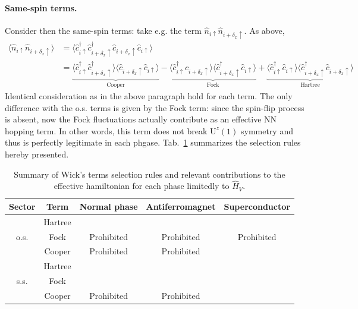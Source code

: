 \paragraph{Same-spin terms.} Consider then the same-spin terms: take e.g. the term $\hat n_{i\uparrow} \hat n_{i + \delta_x \uparrow}$. As above,
\[
\begin{aligned}
	\langle 
	\hat n_{i\uparrow} \hat n_{i + \delta_x \uparrow}
	\rangle &= \langle 
	\hat c_{i\uparrow}^\dagger \hat c_{i + \delta_x \uparrow}^\dagger \hat c_{i + \delta_x \uparrow} \hat c_{i\uparrow} 
	\rangle \\
	&= 
	\underbrace{
		\langle 
		\hat c_{i\uparrow}^\dagger \hat c_{i + \delta_x \uparrow}^\dagger
		\rangle \langle	
		\hat c_{i + \delta_x \uparrow} \hat c_{i\uparrow} 
		\rangle 
	}_{\text{Cooper}}
	- 
	\underbrace{
		\langle 
		\hat c_{i\uparrow}^\dagger \hat c_{i + \delta_x \uparrow}
		\rangle \langle	
		\hat c_{i + \delta_x \uparrow}^\dagger \hat c_{i\uparrow} 
		\rangle 
	}_{\text{Fock}}
	+ 
	\underbrace{
		\langle 
		\hat c_{i\uparrow}^\dagger \hat c_{i\uparrow}
		\rangle \langle	
		\hat c_{i + \delta_x \uparrow}^\dagger \hat c_{i + \delta_x \uparrow} 
		\rangle
	}_{\text{Hartree}}
\end{aligned}
\]
Identical consideration as in the above paragraph hold for each term. The only difference with the o.s. terms is given by the Fock term: since the spin-flip process is absent, now the Fock fluctuations actually contribute as an effective NN hopping term. In other words, this term does not break $\mathrm{U}^z(1)$ symmetry and thus is perfectly legitimate in each phgase. Tab.~\ref{tab:V-wick-terms-phases} summarizes the selection rules hereby presented.

\begin{table}
	\centering
	\begin{tabular}{c c c c c}
		\textbf{Sector}& \textbf{Term} & \textbf{Normal phase} & \textbf{Antiferromagnet} & \textbf{Superconductor} \\
		\midrule
		& Hartree & & & \\
		o.s. & Fock & Prohibited & Prohibited & Prohibited \\
		& Cooper & Prohibited & Prohibited & \\
		\midrule
		& Hartree & & & \\
		s.s. & Fock & & & \\
		& Cooper & Prohibited & Prohibited & \\
		\midrule
	\end{tabular}
	\caption{Summary of Wick's terms selection rules and relevant contributions to the effective hamiltonian for each phase limitedly to $\hat H_V$.}
	\label{tab:V-wick-terms-phases}
\end{table}

